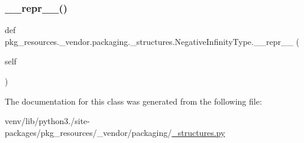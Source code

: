 \subsubsection{\texorpdfstring{\+\_\+\+\_\+repr\+\_\+\+\_\+()}{\_\_repr\_\_()}}
{\footnotesize\ttfamily def pkg\+\_\+resources.\+\_\+vendor.\+packaging.\+\_\+structures.\+Negative\+Infinity\+Type.\+\_\+\+\_\+repr\+\_\+\+\_\+ (\begin{DoxyParamCaption}\item[{}]{self }\end{DoxyParamCaption})}



The documentation for this class was generated from the following file\+:\begin{DoxyCompactItemize}
\item 
venv/lib/python3./site-\/packages/pkg\+\_\+resources/\+\_\+vendor/packaging/\hyperlink{pkg__resources_2__vendor_2packaging_2__structures_8py}{\+\_\+structures.\+py}\end{DoxyCompactItemize}
